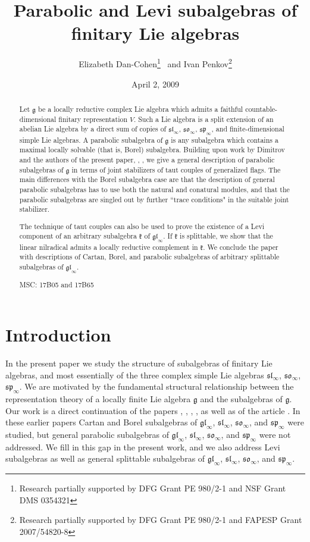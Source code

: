 \documentclass{article}
\def\gl{\mathfrak {gl}}
\def\g{\mathfrak {g}}
\def\sl{\mathfrak{sl}}
\def\so{\mathfrak{so}}
\def\sp{\mathfrak{sp}}
\def\k{\mathfrak{k}}
\begin{document}
\title{Parabolic and Levi subalgebras of finitary Lie algebras}
\author{Elizabeth Dan-Cohen\thanks{Research partially supported by DFG Grant PE 980/2-1 and NSF Grant DMS 0354321} \, and Ivan Penkov\thanks{Research partially supported by DFG Grant PE 980/2-1  and FAPESP Grant 2007/54820-8}}
\date{April 2, 2009}

\maketitle

\begin{abstract}
Let $\g$ be a locally reductive complex Lie algebra which admits a faithful countable-dimensional finitary representation $V$.  Such a Lie algebra is a split extension of an abelian Lie algebra by a direct sum of copies of $\sl_\infty$, $\so_\infty$, $\sp_\infty$, and finite-dimensional simple Lie algebras.  A parabolic subalgebra of $\g$ is any subalgebra which contains a maximal locally solvable (that is, Borel) subalgebra.  Building upon work by Dimitrov and the authors of the present paper, \cite{DP2}, \cite{D}, we give a general description of parabolic subalgebras of $\g$ in terms of joint stabilizers of taut couples of generalized flags.  The main differences with the Borel subalgebra case are that the description of general parabolic subalgebras has to use both the natural and conatural modules, and that the parabolic subalgebras are singled out by further ``trace conditions" in the suitable joint stabilizer.

The technique of taut couples can also be used to prove the existence of a Levi component of an arbitrary subalgebra $\k$ of $\gl_\infty$.  If $\k$ is splittable, we show that the linear nilradical admits a locally reductive complement in $\k$.  We conclude the paper with descriptions of Cartan, Borel, and parabolic subalgebras of arbitrary splittable subalgebras of $\gl_\infty$.

\vspace{5pt}
 MSC: 17B05 and 17B65
\end{abstract}


\section{Introduction}
In the present paper we study the structure of subalgebras of finitary Lie algebras, and most essentially of the three complex simple Lie algebras $\sl_\infty$, $\so_\infty$, $\sp_\infty$. We are motivated by the fundamental structural relationship between the representation theory of a locally finite Lie algebra $\g$ and the subalgebras of $\g $. Our work is a direct continuation of the papers \cite{N-P}, \cite{DP2}, \cite{D}, \cite{DPS}, as well as of the article \cite{DP4}. In these earlier papers Cartan and Borel subalgebras of $\gl_\infty$, $\sl_\infty$, $\so_\infty$, and $\sp_\infty$ were studied, but general parabolic subalgebras of $\gl_\infty$, $\sl_\infty$, $\so_\infty$, and $\sp_\infty$ were not addressed.  We fill in this gap in the present work, and we also address Levi subalgebras as well as general splittable subalgebras of $\gl_\infty$, $\sl_\infty$, $\so_\infty$, and $\sp_\infty$.
\end{document}
